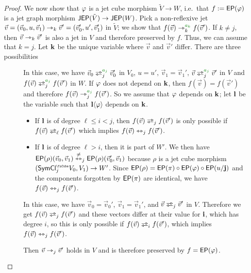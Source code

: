 \documentclass[a4paper]{memoir}
\begin{document}
\begin{proof}
	We now show that $\varphi$ is a jet cube morphism $\tilde V \to W$, i.e.\ that $f := \mathsf{EP}(\varphi)$ is a jet graph morphism $\mathsf{JEP}(\tilde V) \to \mathsf{JEP}(W)$.
	Pick a non-reflexive jet $\vec v = (\vec v_0, u, \vec v_1) \rightarrowtriangle_k \vec v' = (\vec v_0', u', \vec v_1')$ in $\tilde V$; we show that $f(\vec v) \jet_k\pmr{a_k} f(\vec v')$.
	If $k \neq j$, then $\vec v \rightarrowtriangle_k \vec v'$ is also a jet in $V$ and therefore preserved by $f$.
	Thus, we can assume that $k = j$.
	Let $\mathbf{k}$ be the unique variable where $\vec v$ and $\vec v'$ differ.
	There are three possibilities
	\begin{description}
		\item[]
		In this case, we have $\vec v_0 \infrajet_j\pmr{a_j} \vec v_0'$ in $V_0$, $u = u'$, $\vec v_1 = \vec v_1'$, $\vec v \infrajet_j\pmr{a_j} \vec v'$ in $V$ and $f(\vec v) \infrajet_j\pmr{a_j} f(\vec v')$ in $W$.
		If $\varphi$ does not depend on $\mathbf{k}$, then $f(\vec v) = f(\vec v')$ and therefore $f(\vec v) \jet_j\pmr{a_j} f(\vec v')$.
		So we assume that $\varphi$ depends on $\mathbf{k}$; let $\mathbf{l}$ be the variable such that $\mathbf{l} \langle \varphi \rangle$ depends on $\mathbf{k}$.
		\begin{itemize}
			\item If $\mathbf{l}$ is of degree $\ell \leq i < j$, then $f(\vec v) \infrajet_j f(\vec v')$ is only possible if $f(\vec v) \infrajet_\ell f(\vec v')$ which implies $f(\vec v) \leftrightarrowtriangle_j f(\vec v')$.
			\item If $\mathbf{l}$ is of degree $\ell > i$, then it is part of $W'$. We then have $\mathsf{EP}(\rho)(\vec v_0, \vec v_1) \overset{\neq}{\leftrightarrowtriangle}_j \mathsf{EP}(\rho)(\vec v_0', \vec v_1)$ because $\rho$ is a jet cube morphism $(\UFsymcube_j V_0, V_1) \to W'$.
			Since $\mathsf{EP}(\rho) = \mathsf{EP}(\pi) \circ \mathsf{EP}(\varphi) \circ \mathsf{EP}(u/\mathbf{j})$ and the components forgotten by $\mathsf{EP}(\pi)$ are identical,
			we have $f(\vec v) \leftrightarrowtriangle_j f(\vec v')$.
		\end{itemize}
		
		\item[] In this case, we have $\vec v_0 = \vec v_0'$, $\vec v_1 = \vec v_1'$, and $\vec v \infrajet_j \vec v'$ in $V$.
		Therefore we get $f(\vec v) \infrajet_j f(\vec v')$ and these vectors differ at their value for $\mathbf{i}$, which has degree $i$, so this is only possible if $f(\vec v) \infrajet_i f(\vec v')$, which implies $f(\vec v) \leftrightarrowtriangle_j f(\vec v')$.
		
		\item[] Then $\vec v \rightarrowtriangle_j \vec v'$ holds in $V$ and is therefore preserved by $f = \mathsf{EP}(\varphi)$. \qedhere
	\end{description}
\end{proof}
\end{document}
